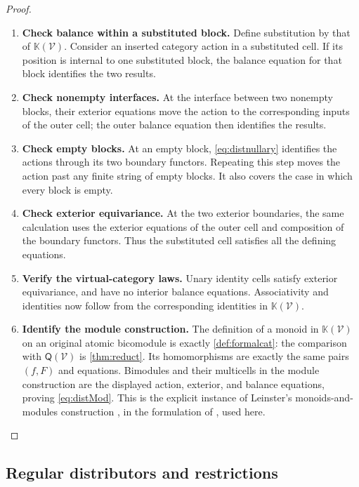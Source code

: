\documentclass[11pt,reqno]{amsart}
\theoremstyle{plain}
\theoremstyle{definition}
\theoremstyle{remark}
\numberwithin{equation}{section}
\newcommand{\V}{\mathcal V}
\newcommand{\Q}{\mathsf Q}
\newcommand{\Kcal}{\mathbb K}
\begin{document}
\begin{proof}\leavevmode
\begin{enumerate}
\item \textbf{Check balance within a substituted block.} Define substitution by that of $\Kcal(\V)$. Consider an inserted
category action in a substituted cell. If its position is internal to
one substituted block, the balance equation for that block identifies the
two results.

\item \textbf{Check nonempty interfaces.} At the interface between two nonempty blocks, their exterior
equations move the action to the corresponding inputs of the outer cell;
the outer balance equation then identifies the results.

\item \textbf{Check empty blocks.} At an empty block,
\cref{eq:distnullary} identifies the actions through its two boundary
functors. Repeating this step moves the action past any finite string of
empty blocks. It also covers the case in which every block is empty.

\item \textbf{Check exterior equivariance.} At the two exterior boundaries, the same calculation uses the exterior
equations of the outer cell and composition of the boundary functors.
Thus the substituted cell satisfies all the defining equations.

\item \textbf{Verify the virtual-category laws.} Unary identity cells satisfy exterior equivariance, and have no interior
balance equations. Associativity and identities now follow from the
corresponding identities in $\Kcal(\V)$.

\item \textbf{Identify the module construction.} The definition of a monoid in
$\Kcal(\V)$ on an original atomic bicomodule is exactly
\cref{def:formalcat}: the comparison with $\Q(\V)$ is
\cref{thm:reduct}. Its homomorphisms are exactly the same pairs $(f,F)$
and equations. Bimodules and their multicells in the module construction
are the displayed action, exterior, and balance equations, proving
\cref{eq:distMod}. This is the explicit instance of Leinster's monoids-and-modules
construction \cite[Section 5.3]{Leinster2004}, in the formulation of
\cite[Definition 2.8]{CruttwellShulman2010}, used here.\qedhere
\end{enumerate}
\end{proof}

\subsection{Regular distributors and restrictions}
\end{document}
